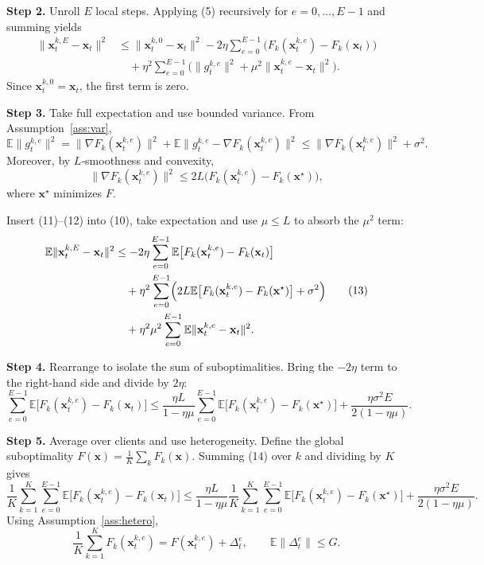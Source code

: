\documentclass{article}
\begin{document}
\textbf{Step 2.}  Unroll $E$ local steps.  
Applying (5) recursively for $e=0,\dots,E-1$ and summing yields
\[
\begin{aligned}
\|\mathbf{x}_{t}^{k,E}-\mathbf{x}_t\|^2
&\le \|\mathbf{x}_{t}^{k,0}-\mathbf{x}_t\|^2
   -2\eta\sum_{e=0}^{E-1}\bigl(F_k(\mathbf{x}_{t}^{k,e})-F_k(\mathbf{x}_t)\bigr)\\
&\quad +\eta^2\sum_{e=0}^{E-1}\bigl(\|g_{t}^{k,e}\|^2+\mu^2\|\mathbf{x}_{t}^{k,e}-\mathbf{x}_t\|^2\bigr).
\end{aligned}
\tag{10}
\]
Since $\mathbf{x}_{t}^{k,0}=\mathbf{x}_t$, the first term is zero.

\textbf{Step 3.}  Take full expectation and use bounded variance.  
From Assumption~\ref{ass:var},
\[
\mathbb{E}\|g_{t}^{k,e}\|^2
   = \|\nabla F_k(\mathbf{x}_{t}^{k,e})\|^2 + \mathbb{E}\|g_{t}^{k,e}-\nabla F_k(\mathbf{x}_{t}^{k,e})\|^2
   \le \|\nabla F_k(\mathbf{x}_{t}^{k,e})\|^2 + \sigma^2.
\tag{11}
\]
Moreover, by $L$‑smoothness and convexity,
\[
\|\nabla F_k(\mathbf{x}_{t}^{k,e})\|^2
   \le 2L\bigl(F_k(\mathbf{x}_{t}^{k,e})-F_k(\mathbf{x}^\star)\bigr),
\tag{12}
\]
where $\mathbf{x}^\star$ minimizes $F$.  

Insert (11)–(12) into (10), take expectation and use $\mu\le L$ to absorb the $\mu^2$ term:
\[
\begin{aligned}
\mathbb{E}\|\mathbf{x}_{t}^{k,E}-\mathbf{x}_t\|^2
&\le -2\eta\sum_{e=0}^{E-1}\mathbb{E}\bigl[F_k(\mathbf{x}_{t}^{k,e})-F_k(\mathbf{x}_t)\bigr]\\
&\quad +\eta^2\sum_{e=0}^{E-1}\Bigl(2L\mathbb{E}\bigl[F_k(\mathbf{x}_{t}^{k,e})-F_k(\mathbf{x}^\star)\bigr]+\sigma^2\Bigr)\\
&\quad +\eta^2\mu^2\sum_{e=0}^{E-1}\mathbb{E}\|\mathbf{x}_{t}^{k,e}-\mathbf{x}_t\|^2 .
\end{aligned}
\tag{13}
\]

\textbf{Step 4.}  Rearrange to isolate the sum of suboptimalities.  
Bring the $-2\eta$ term to the right‑hand side and divide by $2\eta$:
\[
\sum_{e=0}^{E-1}\mathbb{E}\bigl[F_k(\mathbf{x}_{t}^{k,e})-F_k(\mathbf{x}_t)\bigr]
\le
\frac{\eta L}{1-\eta\mu}\sum_{e=0}^{E-1}\mathbb{E}\bigl[F_k(\mathbf{x}_{t}^{k,e})-F_k(\mathbf{x}^\star)\bigr]
   +\frac{\eta\sigma^2 E}{2(1-\eta\mu)} .
\tag{14}
\]

\textbf{Step 5.}  Average over clients and use heterogeneity.  
Define the global suboptimality $F(\mathbf{x})=\frac{1}{K}\sum_k F_k(\mathbf{x})$.  
Summing (14) over $k$ and dividing by $K$ gives
\[
\frac{1}{K}\sum_{k=1}^{K}\sum_{e=0}^{E-1}\mathbb{E}\bigl[F_k(\mathbf{x}_{t}^{k,e})-F_k(\mathbf{x}_t)\bigr]
\le
\frac{\eta L}{1-\eta\mu}\frac{1}{K}\sum_{k=1}^{K}\sum_{e=0}^{E-1}\mathbb{E}\bigl[F_k(\mathbf{x}_{t}^{k,e})-F_k(\mathbf{x}^\star)\bigr]
   +\frac{\eta\sigma^2 E}{2(1-\eta\mu)} .
\tag{15}
\]
Using Assumption~\ref{ass:hetero},
\[
\frac{1}{K}\sum_{k=1}^{K}F_k(\mathbf{x}_{t}^{k,e})
   = F(\mathbf{x}_{t}^{k,e}) + \Delta_{t}^{e},
\qquad
\mathbb{E}\|\Delta_{t}^{e}\| \le G .
\tag{16}
\]
\end{document}
